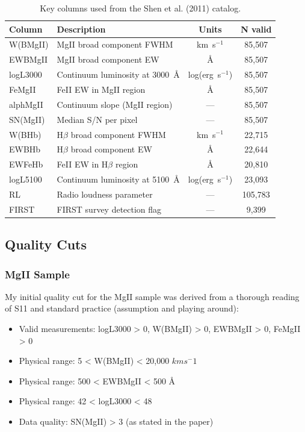 \documentclass[11pt,a4paper]{article}
\begin{document}
\begin{table}
\centering
\caption{Key columns used from the Shen et al. (2011) catalog.}
\label{tab:catalog_columns}
\begin{tabular}{llcc}
\hline
\hline
Column & Description & Units & N valid \\
\hline
W(BMgII) & MgII broad component FWHM & km~s$^{-1}$ & 85,507 \\
EWBMgII & MgII broad component EW & \AA & 85,507 \\
logL3000 & Continuum luminosity at 3000~\AA & log(erg~s$^{-1}$) & 85,507 \\
FeMgII & FeII EW in MgII region & \AA & 85,507 \\
alphMgII & Continuum slope (MgII region) & --- & 85,507 \\
SN(MgII) & Median S/N per pixel & --- & 85,507 \\
W(BHb) & H$\beta$ broad component FWHM & km~s$^{-1}$ & 22,715 \\
EWBHb & H$\beta$ broad component EW & \AA & 22,644 \\
EWFeHb & FeII EW in H$\beta$ region & \AA & 20,810 \\
logL5100 & Continuum luminosity at 5100~\AA & log(erg~s$^{-1}$) & 23,093 \\
RL & Radio loudness parameter & --- & 105,783 \\
FIRST & FIRST survey detection flag & --- & 9,399 \\
\hline
\end{tabular}
\end{table}

\subsection{Quality Cuts}
\subsubsection{MgII Sample}
My initial quality cut for the MgII sample was derived from a thorough reading of S11 and standard practice (assumption and playing around):

\begin{itemize}
    \item Valid measurements: logL3000 > 0, W(BMgII) > 0, EWBMgII > 0, FeMgII > 0
    \item Physical range: 5 < W(BMgII) < 20,000 $kms^-1$
    \item Physical range: 500 < EWBMgII < 500 Å
    \item Physical range: 42 < logL3000 < 48
    \item Data quality: SN(MgII) > 3 (as stated in the paper)
\end{itemize}
\end{document}
